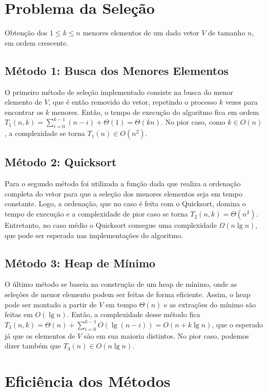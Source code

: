 \section{Problema da Seleção}

Obtenção dos $1 \leq k \leq n$ menores elementos de um dado vetor $V$ de tamanho $n$, em ordem crescente.

\subsection{Método 1: Busca dos Menores Elementos}

O primeiro método de seleção implementado consiste na busca do menor elemento de $V$, que é então removido do vetor, repetindo o processo $k$ vezes para encontrar os $k$ menores. Então, o tempo de execução do algoritmo fica em ordem $T_1(n, k) = \sum_{i = 0}^{k-1} (n - i) + \Theta(1) = \Theta(k n)$. No pior caso, como $k \in O(n)$, a complexidade se torna $T_1(n) \in O\left(n^2\right)$.

\subsection{Método 2: Quicksort}

Para o segundo método foi utilizada a função dada que realiza a ordenação completa do vetor para que a seleção dos menores elementos seja em tempo constante. Logo, a ordenação, que no caso é feita com o Quicksort, domina o tempo de execução e a complexidade de pior caso se torna $T_2(n, k) = \Theta\left(n^2\right)$. Entretanto, no caso médio o Quicksort consegue uma complexidade $\Omega(n \lg n)$, que pode ser esperada nas implementações do algoritmo.

\subsection{Método 3: Heap de Mínimo}

O último método se baseia na construção de um heap de mínimo, onde as seleções de menor elemento podem ser feitas de forma eficiente. Assim, o heap pode ser montado a partir de $V$ em tempo $\Theta(n)$ e as extrações do mínimo são feitas em $O(\lg n)$. Então, a complexidade desse método fica $T_3(n, k) = \Theta(n) + \sum_{i = 0}^{k - 1} O(\lg (n - i)) = O(n + k \lg n)$, que o esperado já que os elementos de $V$ são em sua maioria distintos. No pior caso, podemos dizer também que $T_3(n) \in O(n \lg n)$.

\section{Eficiência dos Métodos}


